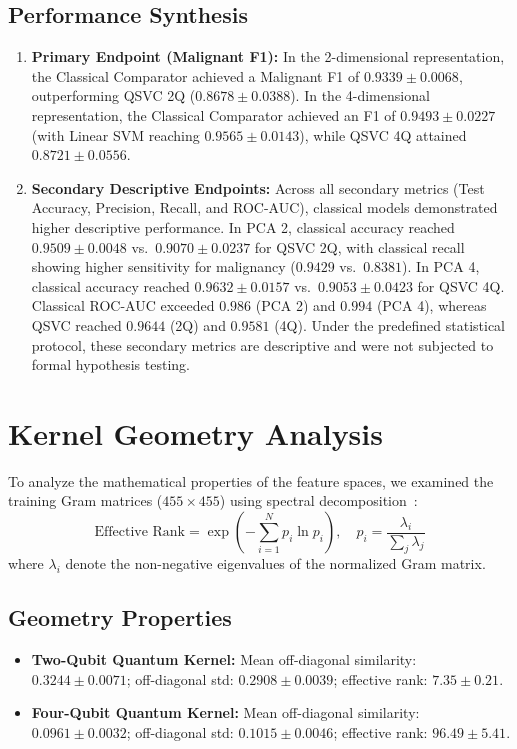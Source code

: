 \documentclass[12pt,a4paper]{article}
\begin{document}
\subsection{Performance Synthesis}
\begin{enumerate}
    \item \textbf{Primary Endpoint (Malignant F1):} In the 2-dimensional representation, the Classical Comparator achieved a Malignant F1 of $0.9339 \pm 0.0068$, outperforming QSVC 2Q ($0.8678 \pm 0.0388$). In the 4-dimensional representation, the Classical Comparator achieved an F1 of $0.9493 \pm 0.0227$ (with Linear SVM reaching $0.9565 \pm 0.0143$), while QSVC 4Q attained $0.8721 \pm 0.0556$.
    \item \textbf{Secondary Descriptive Endpoints:} Across all secondary metrics (Test Accuracy, Precision, Recall, and ROC-AUC), classical models demonstrated higher descriptive performance. In PCA 2, classical accuracy reached $0.9509 \pm 0.0048$ vs.\ $0.9070 \pm 0.0237$ for QSVC 2Q, with classical recall showing higher sensitivity for malignancy ($0.9429$ vs.\ $0.8381$). In PCA 4, classical accuracy reached $0.9632 \pm 0.0157$ vs.\ $0.9053 \pm 0.0423$ for QSVC 4Q. Classical ROC-AUC exceeded $0.986$ (PCA 2) and $0.994$ (PCA 4), whereas QSVC reached $0.9644$ (2Q) and $0.9581$ (4Q). Under the predefined statistical protocol, these secondary metrics are descriptive and were not subjected to formal hypothesis testing.
\end{enumerate}

\section{Kernel Geometry Analysis}
To analyze the mathematical properties of the feature spaces, we examined the training Gram matrices ($455 \times 455$) using spectral decomposition~\cite{canatar2021spectral, kubler2021inductive}:
\begin{equation}
\text{Effective Rank} = \exp\left( -\sum_{i=1}^N p_i \ln p_i \right), \quad p_i = \frac{\lambda_i}{\sum_j \lambda_j}
\end{equation}
where $\lambda_i$ denote the non-negative eigenvalues of the normalized Gram matrix.

\subsection{Geometry Properties}
\begin{itemize}
    \item \textbf{Two-Qubit Quantum Kernel:} Mean off-diagonal similarity: $0.3244 \pm 0.0071$; off-diagonal std: $0.2908 \pm 0.0039$; effective rank: $7.35 \pm 0.21$.
    \item \textbf{Four-Qubit Quantum Kernel:} Mean off-diagonal similarity: $0.0961 \pm 0.0032$; off-diagonal std: $0.1015 \pm 0.0046$; effective rank: $96.49 \pm 5.41$.
\end{itemize}
\end{document}
